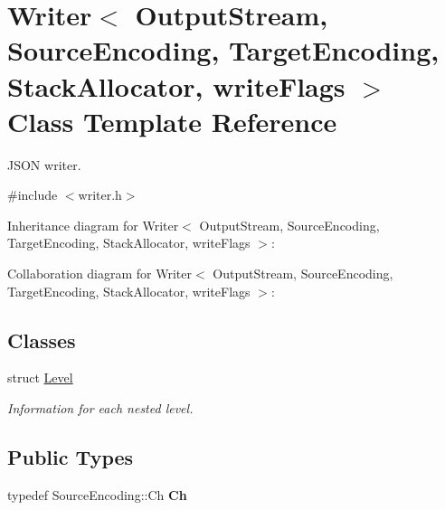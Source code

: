 \hypertarget{class_writer}{}\section{Writer$<$ Output\+Stream, Source\+Encoding, Target\+Encoding, Stack\+Allocator, write\+Flags $>$ Class Template Reference}
\label{class_writer}


J\+S\+ON writer.  




{\ttfamily \#include $<$writer.\+h$>$}



Inheritance diagram for Writer$<$ Output\+Stream, Source\+Encoding, Target\+Encoding, Stack\+Allocator, write\+Flags $>$\+:


Collaboration diagram for Writer$<$ Output\+Stream, Source\+Encoding, Target\+Encoding, Stack\+Allocator, write\+Flags $>$\+:
\subsection*{Classes}
\begin{DoxyCompactItemize}
\item 
struct \hyperlink{struct_writer_1_1_level}{Level}
\begin{DoxyCompactList}\small\item\em Information for each nested level. \end{DoxyCompactList}\end{DoxyCompactItemize}
\subsection*{Public Types}
\begin{DoxyCompactItemize}
\item 
\mbox{\label{class_writer_ab08bff5fd2daec65f4a78779ca3d2139}} 
typedef Source\+Encoding\+::\+Ch {\bfseries Ch}
\end{DoxyCompactItemize}
